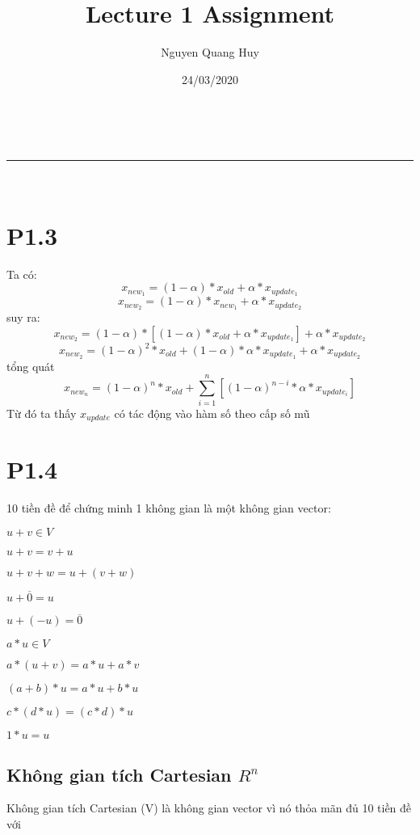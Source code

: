 \documentclass[a4paper,11pt]{article}
\makeatletter
\newcommand{\linia}{\rule{\linewidth}{0.5pt}}
\theoremstyle{mytheor}
\renewcommand{\maketitle}{
\begin{center}
\vspace{2ex}
{\huge \textsc{\@title}}
\vspace{1ex}
\\
\linia\\
\@author \hfill \@date
\vspace{4ex}
\end{center}
}
\makeatother
\begin{document}
\title{Lecture 1 Assignment}

\author{Nguyen Quang Huy}

\date{24/03/2020}

\maketitle

\section*{P1.3}
Ta có:
        $$
            x_{new_1} = (1-\alpha) * x_{old} + \alpha * x_{update_1} 
        $$
        $$
            x_{new_2} = (1-\alpha) * x_{new_1} + \alpha * x_{update_2}
        $$
suy ra:
        $$
            x_{new_2} = (1-\alpha) * [(1-\alpha) * x_{old} + \alpha * x_{update_1}] + \alpha * x_{update_2}
        $$
        $$
            x_{new_2} = (1-\alpha)^2 * x_{old} + (1-\alpha)*\alpha*x_{update_1} + \alpha * x_{update_2}
        $$
tổng quát
        $$
            x_{new_n} = (1-\alpha)^n * x_{old} + \sum\limits_{i=1}^n [(1-\alpha)^{n-i}*\alpha*x_{update_i}]
        $$
Từ đó ta thấy $x_{update}$ có tác động vào hàm số theo cấp số mũ
\section*{P1.4}
10 tiền đề để chứng minh 1 không gian là một không gian vector:
\begin{itemize}
\begin{multicols}{2}
    \item $u + v \in V$  
    \item $u+v = v+u$
    \item $u+v+w = u+(v+w)$
    \item $u+\overline{0} = u$ 
    \item $u+(-u) = \overline{0}$ 
\columnbreak
    \item $a*u \in V $
    \item $a*(u+v) = a*u+a*v$
    \item $(a+b)*u = a*u+b*u$
    \item $c*(d*u) = (c*d)*u$
    \item $1*u = u$
\end{multicols}
\end{itemize}

\subsection*{Không gian tích Cartesian $R^n$}
Không gian tích Cartesian (V) là không gian vector vì nó thỏa mãn đủ 10 tiền đề với \\
    
\end{document}
